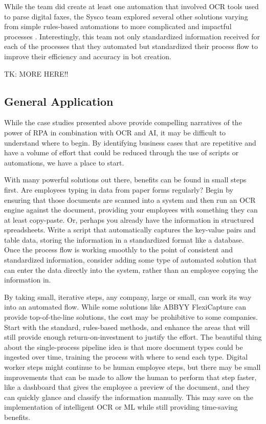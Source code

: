 \documentclass[conference]{IEEEtran}
\begin{document}
While the team did create at least one automation that involved OCR tools used to parse digital faxes, the Sysco team explored several other solutions varying from simple rules-based automations to more complicated and impactful processes \cite{bpcafe2021sysco}. Interestingly, this team not only standardized information received for each of the processes that they automated but standardized their process flow to improve their efficiency and accuracy in bot creation.

TK: MORE HERE!!

\subsection{General Application}
While the case studies presented above provide compelling narratives of the power of RPA in combination with OCR and AI, it may be difficult to understand where to begin. By identifying business cases that are repetitive and have a volume of effort that could be reduced through the use of scripts or automations, we have a place to start.

With many powerful solutions out there, benefits can be found in small steps first. Are employees typing in data from paper forms regularly? Begin by ensuring that those documents are scanned into a system and then run an OCR engine against the document, providing your employees with something they can at least copy-paste. Or, perhaps you already have the information in structured spreadsheets. Write a script that automatically captures the key-value pairs and table data, storing the information in a standardized format like a database. Once the process flow is working smoothly to the point of consistent and standardized information, consider adding some type of automated solution that can enter the data directly into the system, rather than an employee copying the information in.

By taking small, iterative steps, any company, large or small, can work its way into an automated flow. While some solutions like ABBYY FlexiCapture can provide top-of-the-line solutions, the cost may be prohibitive to some companies. Start with the standard, rules-based methods, and enhance the areas that will still provide enough return-on-investment to justify the effort. The beautiful thing about the single-process pipeline idea is that more document types could be ingested over time, training the process with where to send each type. Digital worker steps might continue to be human employee steps, but there may be small improvements that can be made to allow the human to perform that step faster, like a dashboard that gives the employee a preview of the document, and they can quickly glance and classify the information manually. This may save on the implementation of intelligent OCR or ML while still providing time-saving benefits.
\end{document}
